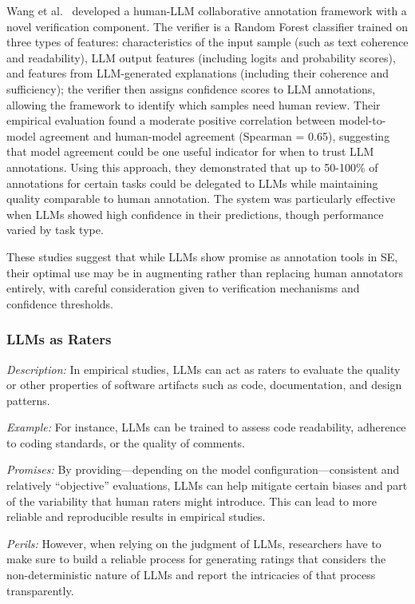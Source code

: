 \documentclass[11pt]{article}
\begin{document}
Wang et al.~\cite{DBLP:conf/chi/Wang0RMM24} developed a human-LLM collaborative annotation framework with a novel verification component. 
The verifier is a Random Forest classifier trained on three types of features: characteristics of the input sample (such as text coherence and readability), LLM output features (including logits and probability scores), and features from LLM-generated explanations (including their coherence and sufficiency); the verifier then assigns confidence scores to LLM annotations, allowing the framework to identify which samples need human review. 
Their empirical evaluation found a moderate positive correlation between model-to-model agreement and human-model agreement (Spearman \rho = 0.65), suggesting that model agreement could be one useful indicator for when to trust LLM annotations.
Using this approach, they demonstrated that up to 50-100\% of annotations for certain tasks could be delegated to LLMs while maintaining quality comparable to human annotation. 
The system was particularly effective when LLMs showed high confidence in their predictions, though performance varied by task type.

These studies suggest that while LLMs show promise as annotation tools in SE, their optimal use may be in augmenting rather than replacing human annotators entirely, with careful consideration given to verification mechanisms and confidence thresholds.

\subsubsection{LLMs as Raters}

\emph{Description:} In empirical studies, LLMs can act as raters to evaluate the quality or other properties of software artifacts such as code, documentation, and design patterns.

\emph{Example:}  For instance, LLMs can be trained to assess code readability, adherence to coding standards, or the quality of comments. 

\emph{Promises:} By providing---depending on the model configuration---consistent and relatively ``objective'' evaluations, LLMs can help mitigate certain biases and part of the variability that human raters might introduce. 
This can lead to more reliable and reproducible results in empirical studies.

\emph{Perils:} However, when relying on the judgment of LLMs, researchers have to make sure to build a reliable process for generating ratings that considers the non-deterministic nature of LLMs and report the intricacies of that process transparently.
\end{document}
